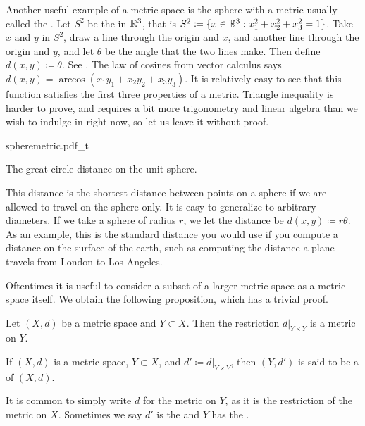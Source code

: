 \begin{example}
Another useful example of a metric space is the sphere
with a metric usually called the \emph{}.
Let $S^2$ be the  in ${\mathbb{R}}^3$,
that is $S^2 \coloneqq \{ x \in {\mathbb{R}}^3 : x_1^2+x_2^2+x_3^2 = 1 \}$.
Take $x$ and $y$ in $S^2$, draw a line through the origin and $x$,
and another line through the origin and $y$,
and let $\theta$ be the angle that the two lines make.
Then define $d(x,y) \coloneqq \theta$.  See .
The law of cosines from vector calculus says
$d(x,y) = \arccos(x_1y_1+x_2y_2+x_3y_3)$.
It is relatively easy to see that this function satisfies the first three
properties of a metric.
Triangle inequality is harder to prove, and requires a bit more
trigonometry and linear algebra than we wish to indulge in right now, so let
us leave it without proof.

\begin{myfigureht}
{spheremetric.pdf_t}
\caption{The great circle distance on the unit
sphere.\label{fig:spheremetric}}
\end{myfigureht}

This distance is the shortest distance between points on a sphere if
we are allowed to travel on the sphere only.  It is easy to
generalize to arbitrary diameters.  If we take a sphere of radius
$r$, we let the distance be $d(x,y) \coloneqq r \theta$.  As an example, this is the
standard distance you would use if you compute a distance on the
surface of the earth, such as computing the distance a plane travels from London to
Los Angeles.
\end{example}

Oftentimes it is useful to consider a subset of a larger metric space
as a metric space itself.  We obtain the following proposition, which has
a trivial proof.

\begin{prop}
Let $(X,d)$ be a metric space and $Y \subset X$.  Then the restriction
$d|_{Y \times Y}$ is a metric on $Y$.
\end{prop}

\begin{defn}
If $(X,d)$ is a metric space, $Y \subset X$, and $d' \coloneqq d|_{Y \times Y}$,
then $(Y,d')$ is said to be a \emph{} of $(X,d)$.
\end{defn}

It is common to simply write $d$ for the metric on $Y$, as it is 
the restriction of the metric on $X$.  Sometimes we say $d'$ is
the \emph{} and $Y$ has the
\emph{}.

